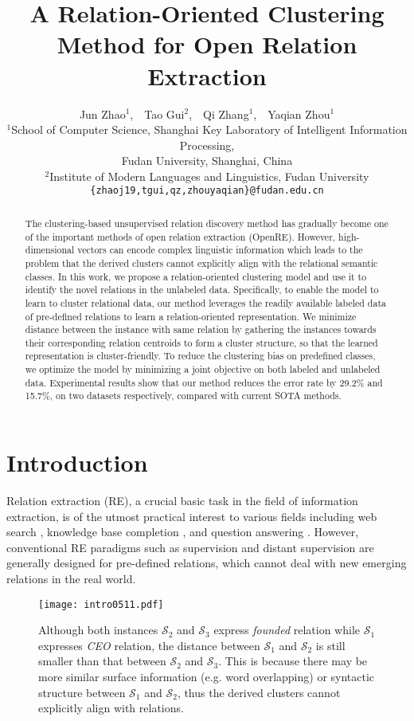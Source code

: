 \documentclass[11pt]{article}
\title{A Relation-Oriented Clustering Method for Open Relation Extraction}
\author{Jun Zhao$^{1}$,\ \ Tao Gui$^{2}$\footnotemark[1],\ \ Qi Zhang$^{1}$\footnotemark[1],\ \  Yaqian Zhou$^1$\\
  $^1$School of Computer Science, Shanghai Key Laboratory of Intelligent Information Processing,\\
  Fudan University, Shanghai, China\\
  $^2$Institute of Modern Languages and Linguistics, Fudan University\\
  \texttt{\{zhaoj19,tgui,qz,zhouyaqian\}@fudan.edu.cn}}
\begin{document}
\maketitle

\renewcommand{\thefootnote}{\fnsymbol{footnote}}
\begin{abstract}

The clustering-based unsupervised relation discovery method has gradually become one of the important methods of open relation extraction (OpenRE). 
However, high-dimensional vectors can encode complex linguistic information which leads to the problem that the derived clusters cannot explicitly align with the relational semantic classes.
In this work, we propose a relation-oriented clustering model and use it to identify the novel relations in the unlabeled data. Specifically, to enable the model to learn to cluster relational data, our method leverages the readily available labeled data of pre-defined relations to learn a relation-oriented representation. 
We minimize distance between the instance with same relation by gathering the instances towards their corresponding relation centroids to form a cluster structure, so that the learned representation is cluster-friendly.
To reduce the clustering bias on predefined classes, we optimize the model by minimizing a joint objective on both labeled and unlabeled data. Experimental results show that our method reduces the error rate by 29.2\% and 15.7\%, on two datasets respectively, compared with current SOTA methods.
\end{abstract}

\section{Introduction}
Relation extraction (RE), a crucial basic task in the field of information extraction, is of the utmost practical interest to various fields including web search \citep{10.1145/3038912.3052558}, knowledge base completion \citep{10.5555/2999792.2999923}, and question answering \citep{yu-etal-2017-improved}. However, conventional RE paradigms such as supervision and distant supervision are generally designed for pre-defined relations, which cannot deal with new emerging relations in the real world.
    \begin{figure}[t]
        \texttt{[image: intro0511.pdf]}
        \caption{Although both instances $\mathcal{S}_2$ and $\mathcal{S}_3$ express \textit{founded} relation while $\mathcal{S}_1$ expresses \textit{CEO} relation, the distance between $\mathcal{S}_1$ and $\mathcal{S}_2$ is still smaller than that between $\mathcal{S}_2$ and $\mathcal{S}_3$. This is because there may be more similar surface information (e.g. word overlapping) or syntactic structure between $\mathcal{S}_1$ and $\mathcal{S}_2$, thus the derived clusters cannot explicitly align with relations.}
        \label{fig:intro}
    \end{figure}
    
\end{document}
